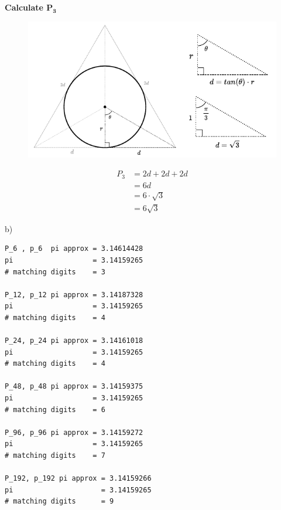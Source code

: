 \documentclass{article}
\begin{document}
\textbf{Calculate $\mathbf{P_3}$}	

\begin{multicols}{2}
	
\begin{figure}[H]
	\centering
	\includegraphics[width=1\linewidth]{../drawings/p1_2}
\end{figure}

\columnbreak

\begin{align*}
	P_{3}&=2d+2d+2d\\ 
	&=6d\\
	&=6\cdot\sqrt{3}\\ 
	&=6\sqrt{3}
\end{align*}
	
\end{multicols}

\noindent
b)
\begin{multicols}{2}
\begin{lstlisting}
P_6 , p_6  pi approx = 3.14614428  
pi                   = 3.14159265  
# matching digits 	 = 3

P_12, p_12 pi approx = 3.14187328  
pi                   = 3.14159265  
# matching digits 	 = 4

P_24, p_24 pi approx = 3.14161018  
pi                   = 3.14159265  
# matching digits 	 = 4

P_48, p_48 pi approx = 3.14159375  
pi                   = 3.14159265  
# matching digits 	 = 6

P_96, p_96 pi approx = 3.14159272  
pi                   = 3.14159265  
# matching digits 	 = 7

P_192, p_192 pi approx = 3.14159266  
pi                     = 3.14159265  
# matching digits 	   = 9

\end{lstlisting}

\end{multicols}
\end{document}
